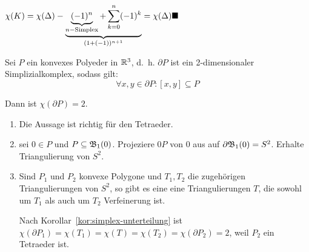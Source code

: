 \begin{beweis}
    $\chi(K) = \chi(\Delta) - \underbrace{\underbrace{(-1)^n}_{n-\text{Simplex}} + \sum_{k=0}^n (-1)^k}_{(1+(-1))^{n+1}} = \chi(\Delta) \qed$
\end{beweis}

\begin{satz}
    Sei $P$ ein konvexes Polyeder in $\mathbb{R}^3$, d.~h. $\partial P$ ist
    ein 2-dimensionaler Simplizialkomplex, sodass gilt:
    \[\forall x,y \in \partial P: [x,y] \subseteq P\]

    Dann ist $\chi(\partial P) = 2$.
\end{satz}

\begin{beweis}\leavevmode
    \begin{enumerate}[label=\arabic*)]
        \item Die Aussage ist richtig für den Tetraeder.
        \item \Obda{} sei $0 \in P$ und $P \subseteq \mathfrak{B}_1(0)$. Projeziere
              $0P$ von $0$ aus auf $\partial \mathfrak{B}_1(0) = S^2$.
              Erhalte Triangulierung von $S^2$.
        \item Sind $P_1$ und $P_2$ konvexe Polygone und $T_1, T_2$
              die zugehörigen Triangulierungen von $S^2$, so gibt es 
              eine eine Triangulierungen $T$, die sowohl um $T_1$ als
              auch um $T_2$ Verfeinerung ist.

              \begin{center}
              \end{center}

              Nach Korollar~\ref{kor:simplex-unterteilung} ist
              $\chi(\partial P_1) = \chi(T_1) = \chi(T) = \chi(T_2) = \chi(\partial P_2) = 2$,
              weil \obda{} $P_2$ ein Tetraeder ist.
    \end{enumerate}
\end{beweis}

